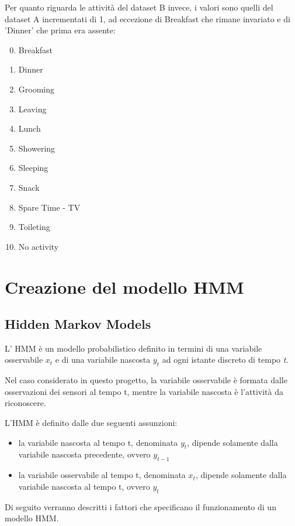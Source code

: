 \documentclass[10pt,a4paper]{article}
\begin{document}
	Per quanto riguarda le attività del dataset B invece, i valori sono quelli del dataset A incrementati di 1, ad eccezione di Breakfast che rimane invariato e di 'Dinner' che prima era assente:
	\begin{enumerate}
	\setcounter{enumi}{-1}
	    \item Breakfast
	    \item Dinner
	    \item Grooming
	    \item Leaving
	    \item Lunch
	    \item Showering
	    \item Sleeping
	    \item Snack
	    \item Spare Time - TV
	    \item Toileting
	    \item No activity
	\end{enumerate}

	\section{Creazione del modello HMM}

	\subsection{Hidden Markov Models}
	L' HMM è un modello probabilistico definito in termini di una variabile osservabile $ x_{t} $ e di una variabile nascosta $ y_{t} $ ad ogni istante discreto di tempo \textit{t}.

	Nel caso considerato in questo progetto, la variabile osservabile è formata dalle osservazioni dei sensori al tempo t, mentre la variabile nascosta è l'attività da riconoscere.

	L'HMM è definito dalle due seguenti assunzioni:

	\begin{itemize}
		\item la variabile nascosta al tempo t, denominata $ y_{t} $, dipende solamente dalla variabile nascosta precedente, ovvero $ y_{t - 1} $
		\item la variabile osservabile al tempo t, denominata $ x_{t} $, dipende solamente dalla variabile nascosta al tempo t, ovvero $ y_{t} $
	\end{itemize}

	Di seguito verranno descritti i fattori che specificano il funzionamento di un modello HMM.
\end{document}
